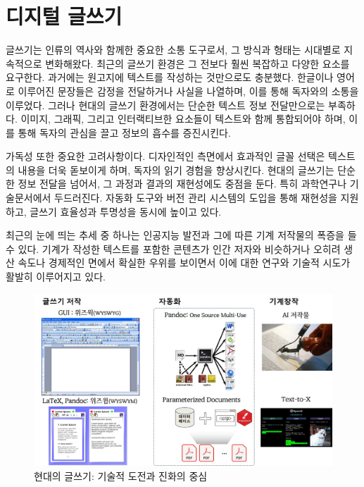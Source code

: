 \documentclass[
  letterpaper,
]{book}
\begin{document}
\hypertarget{uxb514uxc9c0uxd138-uxae00uxc4f0uxae30}{%
\chapter{디지털 글쓰기}\label{uxb514uxc9c0uxd138-uxae00uxc4f0uxae30}}

글쓰기는 인류의 역사와 함께한 중요한 소통 도구로서, 그 방식과 형태는
시대별로 지속적으로 변화해왔다. 최근의 글쓰기 환경은 그 전보다 훨씬
복잡하고 다양한 요소를 요구한다. 과거에는 원고지에 텍스트를 작성하는
것만으로도 충분했다. 한글이나 영어로 이루어진 문장들은 감정을 전달하거나
사실을 나열하며, 이를 통해 독자와의 소통을 이루었다. 그러나 현대의
글쓰기 환경에서는 단순한 텍스트 정보 전달만으로는 부족하다. 이미지,
그래픽, 그리고 인터랙티브한 요소들이 텍스트와 함께 통합되어야 하며, 이를
통해 독자의 관심을 끌고 정보의 흡수를 증진시킨다.

가독성 또한 중요한 고려사항이다. 디자인적인 측면에서 효과적인 글꼴
선택은 텍스트의 내용을 더욱 돋보이게 하며, 독자의 읽기 경험을
향상시킨다. 현대의 글쓰기는 단순한 정보 전달을 넘어서, 그 과정과 결과의
재현성에도 중점을 둔다. 특히 과학연구나 기술문서에서 두드러진다. 자동화
도구와 버전 관리 시스템의 도입을 통해 재현성을 지원하고, 글쓰기 효율성과
투명성을 동시에 높이고 있다.

최근의 눈에 띄는 추세 중 하나는 인공지능 발전과 그에 따른 기계 저작물의
폭증을 들 수 있다. 기계가 작성한 텍스트를 포함한 콘텐츠가 인간 저자와
비슷하거나 오히려 생산 속도나 경제적인 면에서 확실한 우위를 보이면서
이에 대한 연구와 기술적 시도가 활발히 이루어지고 있다.

\begin{figure}

{\centering \includegraphics{images/wyswyg_ai.jpg}

}

\caption{현대의 글쓰기: 기술적 도전과 진화의 중심}

\end{figure}
\end{document}
